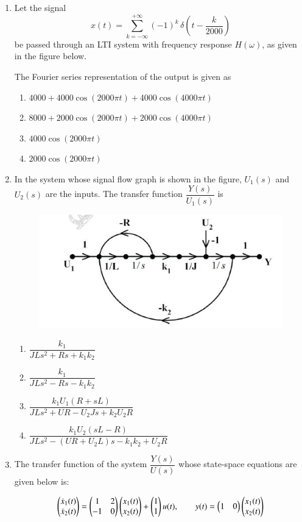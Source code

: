 \documentclass[journal,12pt,onecolumn]{IEEEtran}
\theoremstyle{remark}
\begin{document}
\begin{enumerate}
\item Let the signal 
\[
x(t) = \sum_{k=-\infty}^{+\infty} (-1)^k \, \delta\left(t - \frac{k}{2000}\right)
\]
be passed through an LTI system with frequency response $H(\omega)$, as given in the figure below.  

The Fourier series representation of the output is given as  

\begin{multicols}{2}
\begin{enumerate}
\item $4000 + 4000\cos(2000\pi t) + 4000\cos(4000\pi t)$
\item $8000 + 2000\cos(2000\pi t) + 2000\cos(4000\pi t)$
\item $4000\cos(2000\pi t)$
\item $2000\cos(2000\pi t)$
\end{enumerate}
\end{multicols}

\item In the system whose signal flow graph is shown in the figure, $U_1(s)$ and $U_2(s)$ are the inputs. The transfer function $\dfrac{Y(s)}{U_1(s)}$ is  
\begin{figure}[H]
    \centering
    \includegraphics[width=0.5\columnwidth]{figs/32.png}
    \caption{}
    \label{fig:placeholder}
\end{figure}
\begin{multicols}{2}
\begin{enumerate}
\item $\dfrac{k_1}{JLs^2+Rs+k_1k_2}$
\item $\dfrac{k_1}{JLs^2 - Rs - k_1k_2}$
\item $\dfrac{k_1U_1(R+sL)}{JLs^2+UR-U_2Js+k_2U_2R}$
\item $\dfrac{k_1U_2(sL-R)}{JLs^2-(UR+U_2L)s-k_1k_2+U_2R}$
\end{enumerate}
\end{multicols}

\item The transfer function of the system $\dfrac{Y(s)}{U(s)}$ whose state-space equations are given below is:  

\[
\begin{pmatrix} \dot{x}_1(t) \\ \dot{x}_2(t) \end{pmatrix}
= \begin{pmatrix} 1 & 2 \\ -1 & 0 \end{pmatrix} 
\begin{pmatrix} x_1(t) \\ x_2(t) \end{pmatrix}
+ \begin{pmatrix} 1 \\ 1 \end{pmatrix} u(t),
\qquad
y(t) = \begin{pmatrix} 1 & 0 \end{pmatrix} 
\begin{pmatrix} x_1(t) \\ x_2(t) \end{pmatrix}
\]


\end{enumerate}
\end{document}
